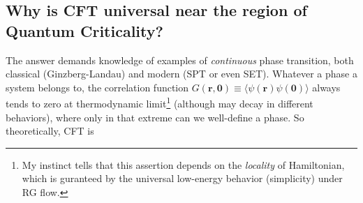 \documentclass[10pt,nofootinbib]{revtex4}
\begin{document}
	\subsection{Why is CFT universal near the region of Quantum Criticality?}
		The answer demands knowledge of examples of \emph{continuous} phase transition, both classical (Ginzberg-Landau) and modern (SPT or even SET). Whatever a phase a system belongs to, the correlation function $G(\bm{r},\bm{0})\equiv\langle\psi(\bm{r})\psi(\bm{0})\rangle$ always tends to zero at thermodynamic limit\footnote{My instinct tells that this assertion depends on the \emph{locality} of Hamiltonian, which is guranteed by the universal low-energy behavior (simplicity) under RG flow.} (although may decay in different behaviors), where only in that extreme can we well-define a phase. So theoretically, CFT is 



\end{document}
